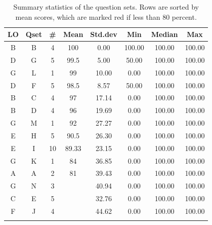 \documentclass[12pt,english,nohyper]{tufte-handout}\usepackage[]{graphicx}\usepackage[]{color}
\begin{document}
\begin{fullwidth}
\makeatletter\setlength\hsize{\@tufte@fullwidth}\makeatother
\begin{longtable}{cc|ccc|ccc}
  \hline
LO & Qset & \# & Mean & Std.dev & Min & Median & Max \\ 
  \hline
B & B &   4 & 100 & 0.00 & 100.00 & 100.00 & 100.00 \\ 
  D & G &   5 & 99.5 & 5.00 & 50.00 & 100.00 & 100.00 \\ 
  G & L &   1 & 99 & 10.00 & 0.00 & 100.00 & 100.00 \\ 
  D & F &   5 & 98.5 & 8.57 & 50.00 & 100.00 & 100.00 \\ 
  B & C &   4 & 97 & 17.14 & 0.00 & 100.00 & 100.00 \\ 
  B & D &   4 & 96 & 19.69 & 0.00 & 100.00 & 100.00 \\ 
  G & M &   1 & 92 & 27.27 & 0.00 & 100.00 & 100.00 \\ 
  E & H &   5 & 90.5 & 26.30 & 0.00 & 100.00 & 100.00 \\ 
  E & I &  10 & 89.33 & 23.15 & 0.00 & 100.00 & 100.00 \\ 
  G & K &   1 & 84 & 36.85 & 0.00 & 100.00 & 100.00 \\ 
  A & A &   2 & 81 & 39.43 & 0.00 & 100.00 & 100.00 \\ 
  G & N &   3 & \color{red}{79} & 40.94 & 0.00 & 100.00 & 100.00 \\ 
  C & E &   5 & \color{red}{78.5} & 32.76 & 0.00 & 100.00 & 100.00 \\ 
  F & J &   4 & \color{red}{73} & 44.62 & 0.00 & 100.00 & 100.00 \\ 
   \hline
\hline
\caption{Summary statistics of the question sets. Rows are sorted by mean scores, which are marked red if less than 80 percent.} 
\label{tab:QuestionSet_summary}
\end{longtable}

\end{fullwidth}
\end{document}
